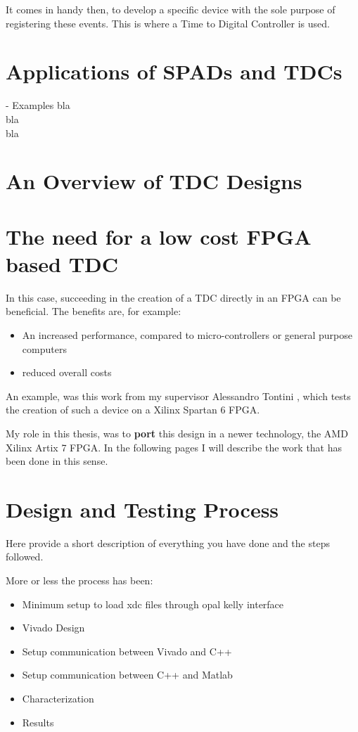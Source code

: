 It comes in handy then, to develop a specific device with the sole purpose of registering these events. This is where a Time to Digital Controller is used.

\section{Applications of SPADs and TDCs}
\label{sec:tdc-examples}
- Examples
bla \\ bla \\ bla

\section{An Overview of TDC Designs}

\section{The need for a low cost FPGA based TDC}
\label{sec:fpga-tdc}
In this case, succeeding in the creation of a TDC directly in an FPGA can be beneficial. The benefits are, for example:
\begin{itemize}
    \item An increased performance, compared to micro-controllers or general purpose computers
    \item reduced overall costs
\end{itemize}
An example, was this work from my supervisor Alessandro Tontini \cite{tdc-tontini}, which tests the creation of such a device on a Xilinx Spartan 6 FPGA.

My role in this thesis, was to \textbf{port} this design in a newer technology, the AMD Xilinx Artix 7 FPGA. In the following pages I will describe the work that has been done in this sense.


\section{Design and Testing Process}

Here provide a short description of everything you have done and the steps followed.

More or less the process has been:

\begin{itemize}
    \item Minimum setup to load xdc files through opal kelly interface
    \item Vivado Design
    \item Setup communication between Vivado and C++
    \item Setup communication between C++ and Matlab
    \item Characterization
    \item Results
\end{itemize}



